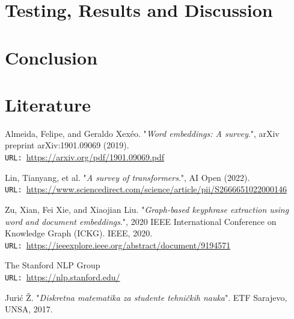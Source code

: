 \documentclass[12pt]{article}
\numberwithin{equation}{section}
\begin{document}
\begin{spacing}{1.5}
	\section{Testing, Results and Discussion}
	
	\section{Conclusion}
	
	\newpage
	\section{Literature}
	
	\begin{thebibliography}{8}
		Almeida, Felipe, and Geraldo Xexéo. "\textit{Word embeddings: A survey}.", arXiv preprint arXiv:1901.09069 (2019). \\
		\texttt{URL: }\url{https://arxiv.org/pdf/1901.09069.pdf}
		
		Lin, Tianyang, et al. "\textit{A survey of transformers}.", AI Open (2022).\\
		\texttt{URL: }\url{https://www.sciencedirect.com/science/article/pii/S2666651022000146}
		
		Zu, Xian, Fei Xie, and Xiaojian Liu. "\textit{Graph-based keyphrase extraction using word and document embeddings}.", 2020 IEEE International Conference on Knowledge Graph (ICKG). IEEE, 2020. \\
		\texttt{URL: }\url{https://ieeexplore.ieee.org/abstract/document/9194571}
		
		The Stanford NLP Group\\
		\texttt{URL: }\url{https://nlp.stanford.edu/}
		
		Jurić Ž. "\textit{Diskretna matematika za studente tehničkih nauka}". ETF Sarajevo, UNSA, 2017. 
		
	\end{thebibliography}

	\end{spacing}
	
\end{document}
